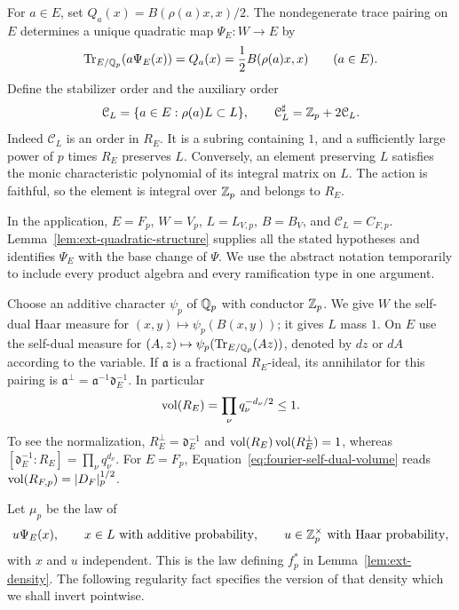 For $a\in E$, set $Q_a(x)=B(\rho(a)x,x)/2$.  The nondegenerate trace pairing
on $E$ determines a unique quadratic map $\Psi_E:W\longrightarrow E$ by
\begin{equation}\label{eq:fourier-polar-identity}
 \operatorname{Tr}_{E/\mathbb Q_p}(a\Psi_E(x))=Q_a(x)
       =\frac12 B(\rho(a)x,x)\qquad(a\in E).
\end{equation}
Define the stabilizer order and the auxiliary order
\[
 \mathcal C_L=\{a\in E:\rho(a)L\subset L\},
 \qquad \mathcal C_L^\sharp=\mathbb Z_p+2\mathcal C_L.
\]
Indeed $\mathcal C_L$ is an order in $R_E$.  It is a subring containing $1$,
and a sufficiently large power of $p$ times $R_E$ preserves $L$.  Conversely,
an element preserving $L$ satisfies the monic characteristic polynomial of
its integral matrix on $L$.  The action is faithful, so the element is
integral over $\mathbb Z_p$ and belongs to $R_E$.

In the application, $E=F_p$, $W=V_p$, $L=L_{V,p}$, $B=B_V$, and
$\mathcal C_L=C_{F,p}$.  Lemma~\ref{lem:ext-quadratic-structure} supplies
all the stated hypotheses and identifies $\Psi_E$ with the base change of
$\Psi$.  We use the abstract notation temporarily to include every product
algebra and every ramification type in one argument.

Choose an additive character $\psi_p$ of $\mathbb Q_p$ with conductor $\mathbb Z_p$.
We give $W$ the self-dual Haar measure for $(x,y)\mapsto\psi_p(B(x,y))$;
it gives $L$ mass $1$.  On $E$ use the self-dual measure for
$(A,z)\mapsto\psi_p(\operatorname{Tr}_{E/\mathbb Q_p}(Az))$, denoted by $dz$ or $dA$ according
to the variable.  If $\mathfrak a$ is a fractional $R_E$-ideal, its
annihilator for this pairing is
$\mathfrak a^\perp=\mathfrak a^{-1}\mathfrak d_E^{-1}$.  In particular
\begin{equation}\label{eq:fourier-self-dual-volume}
 \operatorname{vol}(R_E)=\prod_\nu q_\nu^{-d_\nu/2}\le1.
\end{equation}
To see the normalization, $R_E^\perp=\mathfrak d_E^{-1}$ and
$\operatorname{vol}(R_E)\operatorname{vol}(R_E^\perp)=1$, whereas
$[\mathfrak d_E^{-1}:R_E]=\prod_\nu q_\nu^{d_\nu}$.
For $E=F_p$, Equation~\eqref{eq:fourier-self-dual-volume} reads
$\operatorname{vol}(R_{F,p})=|D_F|_p^{1/2}$.

Let $\mu_p$ be the law of
\begin{equation}\label{eq:fourier-density-law}
 u\Psi_E(x),\qquad x\in L\text{ with additive probability},
 \qquad u\in\mathbb Z_p^\times\text{ with Haar probability},
\end{equation}
with $x$ and $u$ independent.  This is the law defining $f_p^*$ in
Lemma~\ref{lem:ext-density}.  The following regularity fact specifies the
version of that density which we shall invert pointwise.

